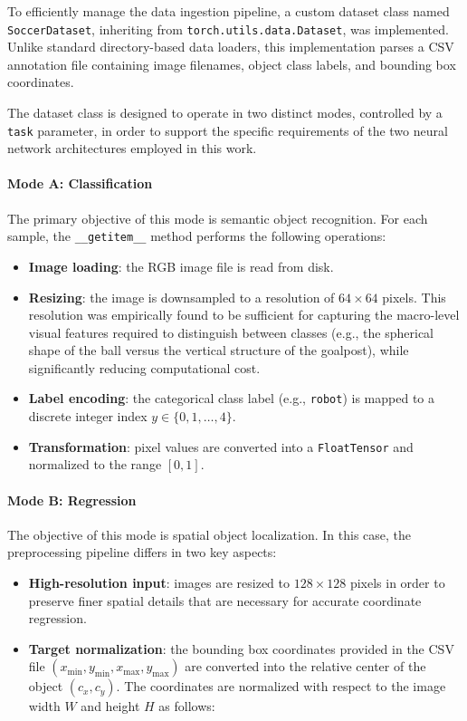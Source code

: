 \documentclass[a4paper,11pt]{article}
\begin{document}
To efficiently manage the data ingestion pipeline, a custom dataset class named \texttt{SoccerDataset}, inheriting from \texttt{torch.utils.data.Dataset}, was implemented. Unlike standard directory-based data loaders, this implementation parses a CSV annotation file containing image filenames, object class labels, and bounding box coordinates.

The dataset class is designed to operate in two distinct modes, controlled by a \texttt{task} parameter, in order to support the specific requirements of the two neural network architectures employed in this work.

\paragraph{Mode A: Classification}
The primary objective of this mode is semantic object recognition. For each sample, the \texttt{\_\_getitem\_\_} method performs the following operations:
\begin{itemize}
    \item \textbf{Image loading}: the RGB image file is read from disk.
    \item \textbf{Resizing}: the image is downsampled to a resolution of $64 \times 64$ pixels. This resolution was empirically found to be sufficient for capturing the macro-level visual features required to distinguish between classes (e.g., the spherical shape of the ball versus the vertical structure of the goalpost), while significantly reducing computational cost.
    \item \textbf{Label encoding}: the categorical class label (e.g., \texttt{robot}) is mapped to a discrete integer index $y \in \{0, 1, \dots, 4\}$.
    \item \textbf{Transformation}: pixel values are converted into a \texttt{FloatTensor} and normalized to the range $[0, 1]$.
\end{itemize}

\paragraph{Mode B: Regression}
The objective of this mode is spatial object localization. In this case, the preprocessing pipeline differs in two key aspects:
\begin{itemize}
    \item \textbf{High-resolution input}: images are resized to $128 \times 128$ pixels in order to preserve finer spatial details that are necessary for accurate coordinate regression.
    \item \textbf{Target normalization}: the bounding box coordinates provided in the CSV file $(x_{\min}, y_{\min}, x_{\max}, y_{\max})$ are converted into the relative center of the object $(c_x, c_y)$. The coordinates are normalized with respect to the image width $W$ and height $H$ as follows:
\end{itemize}
\end{document}
